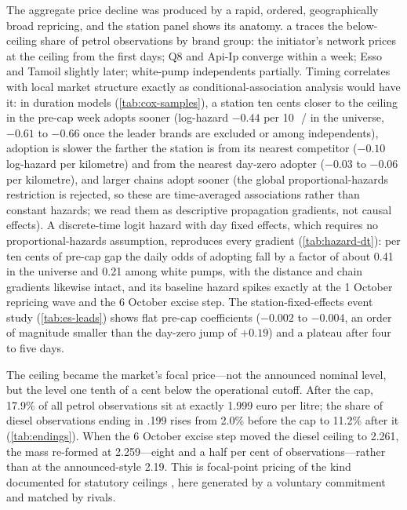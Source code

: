 \documentclass[11pt]{article}
\newcommand{\cl}{\,\text{c}/\text{l}}
\begin{document}
The aggregate price decline was produced by a rapid, ordered,
geographically broad repricing, and the station panel shows its anatomy.
a traces the below-ceiling share of petrol observations
by brand group: the initiator's network prices at the ceiling from the
first days; Q8 and Api-Ip converge within a week; Esso and Tamoil
slightly later; white-pump independents partially. Timing correlates
with local market structure exactly as conditional-association analysis
would have it: in duration models (\cref{tab:cox-samples}), a station ten cents
closer to the ceiling in the pre-cap week adopts sooner (log-hazard
$-0.44$ per 10~\cl{} in the universe, $-0.61$ to $-0.66$ once the leader
brands are excluded or among independents), adoption is slower the
farther the station is from its nearest competitor ($-0.10$ log-hazard
per kilometre) and from the nearest day-zero adopter ($-0.03$ to
$-0.06$ per kilometre), and larger chains adopt sooner (the global
proportional-hazards restriction is rejected, so these are
time-averaged associations rather than constant hazards; we read them as
descriptive propagation gradients, not causal effects). A discrete-time
logit hazard with day fixed effects, which requires no
proportional-hazards assumption, reproduces every gradient
(\cref{tab:hazard-dt}): per ten cents of pre-cap gap the daily odds of
adopting fall by a factor of about 0.41 in the universe and 0.21 among
white pumps, with the distance and chain gradients likewise intact, and
its baseline hazard spikes exactly at the 1 October repricing wave and
the 6 October excise step. The
station-fixed-effects event study (\cref{tab:es-leads}) shows flat
pre-cap coefficients ($-0.002$ to $-0.004$, an order of magnitude
smaller than the day-zero jump of $+0.19$) and a plateau after four to
five days.

The ceiling became the market's focal price---not the announced nominal
level, but the level one tenth of a cent below the operational cutoff.
After the cap, 17.9\% of all petrol observations sit at exactly
1.999 euro per litre; the share of diesel observations ending in .199 rises
from 2.0\% before the cap to 11.2\% after it
(\cref{tab:endings}). When the 6 October excise step moved the diesel
ceiling to 2.261, the mass re-formed at 2.259---eight and a half per
cent of observations---rather than at the announced-style 2.19. This is
focal-point pricing of the kind documented for statutory ceilings
\parencite{zhang2020, gatsios2026}, here generated by a voluntary
commitment and matched by rivals.
\end{document}
